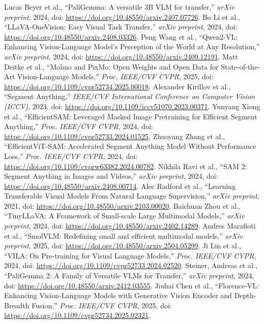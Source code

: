  Lucas Beyer et al., ``PaliGemma: A versatile 3B VLM for transfer,'' \emph{arXiv preprint}, 2024, doi: \url{https://doi.org/10.48550/arxiv.2407.07726}.
 Bo Li et al., ``LLaVA-OneVision: Easy Visual Task Transfer,'' \emph{arXiv preprint}, 2024, doi: \url{https://doi.org/10.48550/arxiv.2408.03326}.
 Peng Wang et al., ``Qwen2-VL: Enhancing Vision-Language Model's Perception of the World at Any Resolution,'' \emph{arXiv preprint}, 2024, doi: \url{https://doi.org/10.48550/arxiv.2409.12191}.
 Matt Deitke et al., ``Molmo and PixMo: Open Weights and Open Data for State-of-the-Art Vision-Language Models,'' \emph{Proc. IEEE/CVF CVPR}, 2025, doi: \url{https://doi.org/10.1109/cvpr52734.2025.00018}.
 Alexander Kirillov et al., ``Segment Anything,'' \emph{IEEE/CVF International Conference on Computer Vision (ICCV)}, 2023, doi: \url{https://doi.org/10.1109/iccv51070.2023.00371}.
 Yunyang Xiong et al., ``EfficientSAM: Leveraged Masked Image Pretraining for Efficient Segment Anything,'' \emph{Proc. IEEE/CVF CVPR}, 2024, doi: \url{https://doi.org/10.1109/cvpr52733.2024.01525}.
 Zhuoyang Zhang et al., ``EfficientViT-SAM: Accelerated Segment Anything Model Without Performance Loss,'' \emph{Proc. IEEE/CVF CVPR}, 2024, doi: \url{https://doi.org/10.1109/cvprw63382.2024.00782}.
 Nikhila Ravi et al., ``SAM 2: Segment Anything in Images and Videos,'' \emph{arXiv preprint}, 2024, doi: \url{https://doi.org/10.48550/arxiv.2408.00714}.
 Alec Radford et al., ``Learning Transferable Visual Models From Natural Language Supervision,'' \emph{arXiv preprint}, 2021, doi: \url{https://doi.org/10.48550/arxiv.2103.00020}.
 Baichuan Zhou et al., ``TinyLLaVA: A Framework of Small-scale Large Multimodal Models,'' \emph{arXiv preprint}, 2024, doi: \url{https://doi.org/10.48550/arxiv.2402.14289}.
 Andres Marafioti et al., ``SmolVLM: Redefining small and efficient multimodal models,'' \emph{arXiv preprint}, 2025, doi: \url{https://doi.org/10.48550/arxiv.2504.05299}.
 Ji Lin et al., ``VILA: On Pre-training for Visual Language Models,'' \emph{Proc. IEEE/CVF CVPR}, 2024, doi: \url{https://doi.org/10.1109/cvpr52733.2024.02520}.
 Steiner, Andreas et al., ``PaliGemma 2: A Family of Versatile VLMs for Transfer,'' \emph{arXiv preprint}, 2024, doi: \url{https://doi.org/10.48550/arxiv.2412.03555}.
 Jiuhai Chen et al., ``Florence-VL: Enhancing Vision-Language Models with Generative Vision Encoder and Depth-Breadth Fusion,'' \emph{Proc. IEEE/CVF CVPR}, 2025, doi: \url{https://doi.org/10.1109/cvpr52734.2025.02321}.
